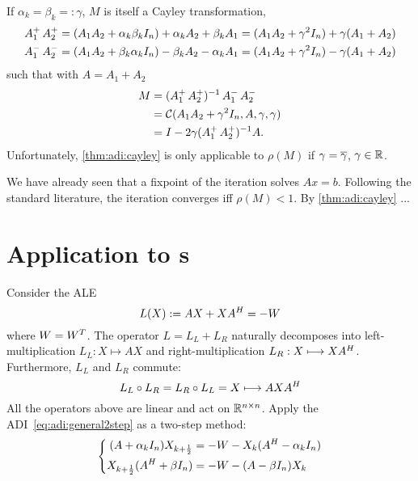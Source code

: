 \begin{remark}
  If $\alpha_k = \beta_k =: \gamma$,
  $M$ is itself a Cayley transformation,
  \begin{align*}
    \mathop{A_1^+}\mathop{A_2^+}
    &= (A_1A_2 + \alpha_k\beta_k I_n) + \alpha_k A_2 + \beta_k  A_1
    = (A_1A_2 + \gamma^2 I_n) + \gamma(A_1 + A_2)
    \\
    \mathop{A_1^-}\mathop{A_2^-}
    &= (A_1A_2 + \beta_k\alpha_k I_n) - \beta_k  A_2 - \alpha_k A_1
    = (A_1A_2 + \gamma^2 I_n) - \gamma(A_1 + A_2)
  \end{align*}
  such that with $A=A_1+A_2$
  \begin{align*}
    M
    &= (\mathop{A_1^+}\mathop{A_2^+})^{-1} \mathop{A_1^-}\mathop{A_2^-} \\
    &= \mathcal C(A_1A_2 + \gamma^2 I_n, A, \gamma, \gamma) \\
    &= I - 2\gamma(\mathop{A_1^+} \mathop{A_2^+})^{-1} A
    .
  \end{align*}
  Unfortunately, \autoref{thm:adi:cayley} is only applicable to $\rho(M)$ if $\gamma=\conj\gamma$,
  \ie $\gamma\in\mathbb{R}$.
\end{remark}

We have already seen that a fixpoint of the iteration solves $Ax=b$.
Following the standard literature,
the iteration converges iff $\rho(M) < 1$.
By \autoref{thm:adi:cayley} ...



\section{Application to s}
\label{sec:adi:ale}

Consider the \ac{ALE}
\begin{equation*}
\label{eq:adi:ale}
  L(X) := AX + XA^H = -W
\end{equation*}
where $W = W^T$.
The \Lyapunov operator $L = L_L + L_R$ naturally decomposes into
left-multiplication $L_L : X \mapsto AX$ and
right-multiplication $L_R : X \longmapsto XA^H$.
Furthermore, $L_L$ and $L_R$ commute:
\begin{equation*}
  L_L \circ L_R = L_R \circ L_L = X \longmapsto AXA^H
\end{equation*}
All the operators above are linear and act on $\mathbb{R}^{n\times n}$.
Apply the \ac{ADI}~\eqref{eq:adi:general2step} as a two-step method:
\begin{equation}
  \left\{
  \begin{aligned}
    (A + \alpha_k I_n) X_{k+\frac{1}{2}} &= -W - X_k (A^H - \alpha_k I_n) \\
    X_{k+\frac{1}{2}} (A^H + \beta I_n) &= -W - (A - \beta I_n) X_k
  \end{aligned}
  \right.
\end{equation}

